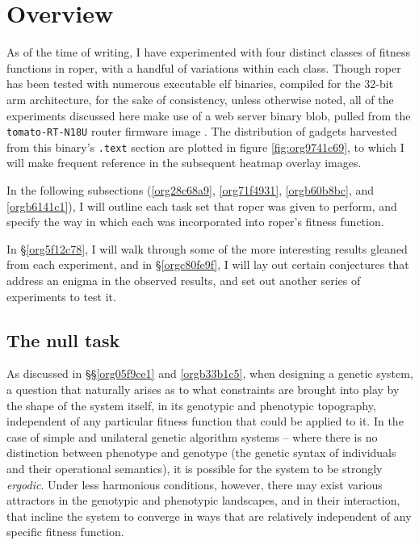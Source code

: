 \documentclass[12pt,glossary]{dalthesis}
\begin{document}
\section{Overview}
\label{sec:org9f7d266}
\label{org62eb4cd}

As of the time of writing, I have experimented with four distinct classes of
fitness functions in \gls{roper}, with a handful of variations within each class.
Though \gls{roper} has been tested with numerous executable \gls{elf} binaries,
compiled for the 32-bit \gls{arm} architecture, for the sake of consistency, 
unless otherwise noted, all of the experiments discussed here make use of
a web server binary blob, pulled from the \texttt{tomato-RT-N18U} router firmware
image \cite{tomato-RT-N18U}. The distribution of gadgets harvested from this
binary's \texttt{.text} section are plotted in figure \ref{fig:org9741c69}, to which
I will make frequent reference in the subsequent heatmap overlay images.

In the following subsections (\ref{org28c68a9}, \ref{org71f4931},
\ref{orgb60b8bc}, and \ref{orgb6141c1}), I will outline each task set that
\gls{roper} was given to perform, and specify the way in which each was
incorporated into \gls{roper}'s fitness function.

In \S \ref{org5f12c78}, I will walk through some of the more interesting results
gleaned from each experiment, and in \S \ref{orgc80fe9f}, I will lay out certain
conjectures that address an enigma in the observed results, and set out another
series of experiments to test it. 

\subsection{The null task}
\label{sec:org88c7576}
\label{org28c68a9}

As discussed in \S\S \ref{org05f9ce1} and \ref{orgb33b1c5}, when designing a genetic
system, a question that naturally arises as to what constraints are brought into
play by the shape of the system itself, in its genotypic and phenotypic topography,
independent of any particular fitness function that could be applied to it. In the
case of simple and unilateral genetic algorithm systems -- where there is no distinction
between phenotype and genotype (the genetic syntax of individuals and their 
operational semantics), it is possible for the system to be strongly \emph{ergodic}.
Under less harmonious conditions, however, there may exist various attractors in
the genotypic and phenotypic landscapes, and in their interaction, that incline
the system to converge in ways that are relatively independent of any specific
fitness function. 
\end{document}
